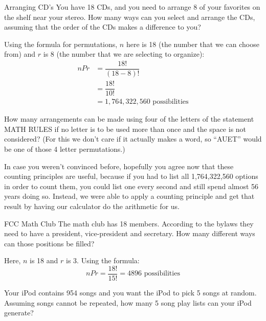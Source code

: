\begin{example}[https://www.youtube.com/watch?v=vnvlFNwFUQc&list=PLfmpjsIzhzts14-9s5QixRje97EI2oeMF&index=30]{Arranging CD's}
You have 18 CDs, and you need to arrange 8 of your favorites on the shelf near your stereo.
How many ways can you select and arrange the CDs, assuming that the order of the CDs makes a
difference to you?

\sol
Using the formula for permutations, $n$ here is 18 (the number that we can choose from) and $r$ is 8 (the number that we are selecting to organize):
\begin{align*}
nPr &= \dfrac{18!}{(18-8)!}\\
&= \dfrac{18!}{10!}\\
&= \boxed{1,764,322,560 \textrm{ possibilities}}
\end{align*}
\end{example}

\begin{try}
How many arrangements can be made using four of the letters of the statement
MATH RULES if no letter is to be used more than once and the space is not considered? (For this we don't care if it
actually makes a word, so ``AUET'' would be one of those 4 letter permutations.)
\end{try}

In case you weren't convinced before, hopefully you agree now that these counting principles are useful, because if you had to list all 1,764,322,560 options in order to count them, you could list one every second and still spend almost 56 years doing so.  Instead, we were able to apply a counting principle and get that result by having our calculator do the arithmetic for us.
\pagebreak

\begin{example}[https://www.youtube.com/watch?v=XGwosYiNY2I&list=PLfmpjsIzhzts14-9s5QixRje97EI2oeMF&index=31]{FCC Math Club}
The math club has 18 members. According to the bylaws they need to have a president,
vice-president and secretary. How many different ways can those positions be filled?

\sol Here, $n$ is 18 and $r$ is 3.  Using the formula: \[nPr = \dfrac{18!}{15!} = \boxed{4896 \textrm{ possibilities}}\]
\end{example}

\begin{try}
Your iPod contains 954 songs and you want the iPod to pick 5 songs at random.
Assuming songs cannot be repeated, how many 5 song play lists can your iPod generate?
\end{try}

